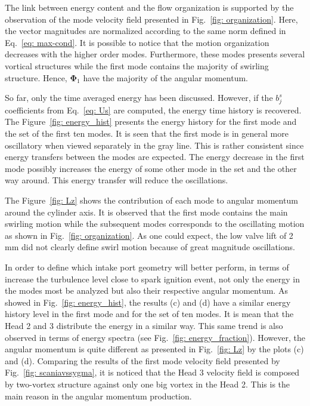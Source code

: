 \documentclass[10pt,fleqn,a4paper]{article}
\newcommand{\bv}[1]{\mathbf{#1}}
\begin{document}
The link between energy content and the flow organization is supported by the observation of the mode velocity field presented in Fig.~\ref{fig: organization}. Here, the vector magnitudes are normalized according to the same norm defined in Eq.~\eqref{eq: max-cond}. It is possible to notice that the motion organization decreases with the higher order modes. Furthermore, these modes presents several vortical structures while the first mode contains the majority of swirling structure. Hence, $\bv{\Phi}_1$ have the majority of the angular momentum. 

So far, only the time averaged energy has been discussed. However, if the $b^{s}_{j}$ coefficients from Eq.~\eqref{eq: Us} are computed, the energy time history is recovered. The Figure~\ref{fig: energy_hist} presents the energy history for the first mode and the set of the first ten modes. It is seen that the first mode is in general more oscillatory when viewed separately in the gray line.  This is rather consistent since energy transfers between the modes are expected. The energy decrease in the first mode possibly increases the energy of some other mode in the set and the other way around. This energy transfer will reduce the oscillations.

The Figure~\ref{fig: Lz} shows the contribution of each mode to angular momentum around the cylinder axis. It is observed that the first mode contains the main swirling motion while the subsequent modes corresponds to the oscillating motion as shown in Fig.~\ref{fig: organization}. As one could expect, the low valve lift of 2\,mm did not clearly define swirl motion because of great magnitude oscillations.

In order to define which intake port geometry will better perform, in terms of increase the turbulence level close to spark ignition event, not only the energy in the modes most be analyzed but also their respective angular momentum. As showed in Fig.~\ref{fig: energy_hist}, the results (c) and (d) have a similar energy history level in the first mode and for the set of ten modes. It is mean that the Head 2 and 3 distribute the energy in a similar way. This same trend is also observed in terms of energy spectra (see Fig.~\ref{fig: energy_fraction}). However, the angular momentum is quite different as presented in Fig.~\ref{fig: Lz} by the plots (c) and (d). Comparing the results of the first mode velocity field presented by Fig.~\ref{fig: scaniavssygma}, it is noticed that the Head 3 velocity field is composed by two-vortex structure against only one big vortex in the Head 2. This is the main reason in the angular momentum production.
\end{document}
